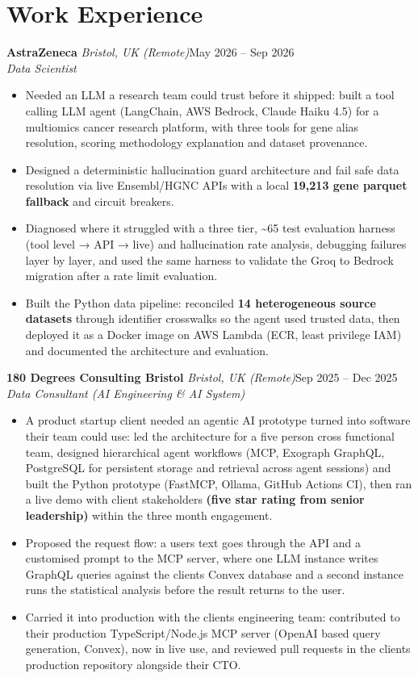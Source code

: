 \documentclass[a4paper,11pt]{article}
\newcommand{\role}[4]{%
  \textbf{#1}{\color{muted}\,\textperiodcentered\,\textit{#2}}\hfill{\color{muted}#3}\\
  \textit{#4}\par}
\newcommand{\gap}{\vspace{5pt}}
\newcommand{\num}[1]{\textbf{#1}}   %
\begin{document}
\section{Work Experience}
\role{AstraZeneca}{Bristol, UK (Remote)}{May 2026 – Sep 2026}{Data Scientist}
\begin{itemize}
  \item Needed an LLM a research team could trust before it shipped: built a tool calling LLM agent (LangChain, AWS Bedrock, Claude Haiku 4.5) for a multiomics cancer research platform, with three tools for gene alias resolution, scoring methodology explanation and dataset provenance.
  \item Designed a deterministic hallucination guard architecture and fail safe data resolution via live Ensembl/HGNC APIs with a local \num{19,213 gene parquet fallback} and circuit breakers.
  \item Diagnosed where it struggled with a three tier, \textasciitilde{}65 test evaluation harness (tool level → API → live) and hallucination rate analysis, debugging failures layer by layer, and used the same harness to validate the Groq to Bedrock migration after a rate limit evaluation.
  \item Built the Python data pipeline: reconciled \num{14 heterogeneous source datasets} through identifier crosswalks so the agent used trusted data, then deployed it as a Docker image on AWS Lambda (ECR, least privilege IAM) and documented the architecture and evaluation.
\end{itemize}
\gap
{}
\role{180 Degrees Consulting Bristol}{Bristol, UK (Remote)}{Sep 2025 – Dec 2025}{Data Consultant (AI Engineering \& AI System)}
\begin{itemize}
  \item A product startup client needed an agentic AI prototype turned into software their team could use: led the architecture for a five person cross functional team, designed hierarchical agent workflows (MCP, Exograph GraphQL, PostgreSQL for persistent storage and retrieval across agent sessions) and built the Python prototype (FastMCP, Ollama, GitHub Actions CI), then ran a live demo with client stakeholders \num{(five star rating from senior leadership)} within the three month engagement.
  \item Proposed the request flow: a user\textquotesingle{}s text goes through the API and a customised prompt to the MCP server, where one LLM instance writes GraphQL queries against the client\textquotesingle{}s Convex database and a second instance runs the statistical analysis before the result returns to the user.
  \item Carried it into production with the client\textquotesingle{}s engineering team: contributed to their production TypeScript/Node.js MCP server (OpenAI based query generation, Convex), now in live use, and reviewed pull requests in the client\textquotesingle{}s production repository alongside their CTO.
\end{itemize}
\end{document}
